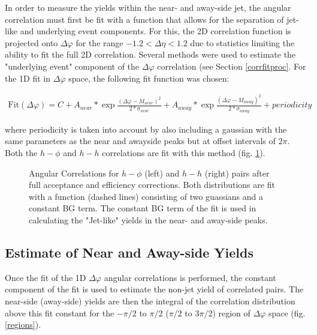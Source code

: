 \documentclass[ALICE,manyauthors]{ALICE_analysis_notes}
\begin{document}
\begin{itemize}
In order to measure the yields within the near- and away-side jet, the angular correlation must first be fit with a function that allows for the separation of jet-like and underlying event components.  For this, the 2D correlation function is projected onto $\Delta\varphi$ for the range $-1.2 < \Delta\eta < 1.2$ due to statistics limiting the ability to fit the full 2D correlation. Several methods were used to estimate the "underlying event" component of the $\Delta\varphi$ correlation (see Section \ref{corrfitproc}. For the 1D fit in $\Delta\varphi$ space, the following fit function was chosen:

\begin{align}
	\text{Fit}(\Delta\varphi) = C + A_{near}*\exp{\frac{(\Delta\varphi - M_{near})^2}{2*\sigma_{near}}} + A_{away}*\exp{\frac{(\Delta\varphi - M_{away})^2}{2*\sigma_{away}}} + \textit{periodicity}
\end{align}

where periodicity is taken into account by also including a gaussian with the same parameters as the near and awayside peaks but at offset intervals of $2\pi$. Both the $h-\phi$ and $h-h$ correlations are fit with this method (fig. \ref{dphi}).
\begin{figure}[ht]
\begin{subfigure}{
\texttt{[image: images/dphi\_hPhi\_0\_20.pdf]}}
\end{subfigure}
\begin{subfigure}{
\texttt{[image: images/dphi\_hh\_0\_20.pdf]}}
\end{subfigure}
\caption{Angular Correlations for $h-\phi$ (left) and $h-h$ (right) pairs after full acceptance and efficiency corrections.  Both distributions are fit with a function (dashed lines) consisting of two guassians and a constant BG term. The constant BG term of the fit is used in calculating the "Jet-like" yields in the near- and away-side peaks.}
\label{dphi}
\end{figure}
\subsection{Estimate of Near and Away-side Yields}

Once the fit of the 1D $\Delta\varphi$ angular correlations is performed, the constant component of the fit is used to estimate the non-jet yield of correlated pairs.  The near-side (away-side) yields are then the integral of the correlation distribution above this fit constant for the $-\pi/2$ to $\pi/2$ ($\pi/2$ to $3\pi/2$) region of $\Delta\varphi$ space (fig. \ref{regions}).


\end{itemize}
\end{document}
